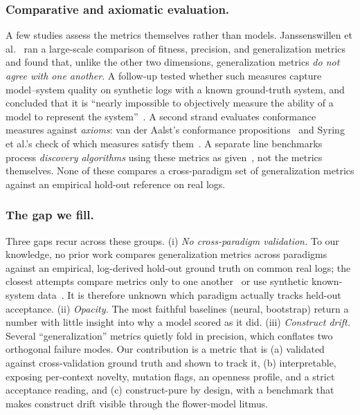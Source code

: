 \documentclass[runningheads]{llncs}
\begin{document}
\subsubsection{Comparative and axiomatic evaluation.}
A few studies assess the metrics themselves rather than models. Janssenswillen et al.~\cite{janssenswillen2017comparative} ran a large-scale comparison of fitness, precision, and generalization metrics and found that, unlike the other two dimensions, generalization metrics \emph{do not agree with one another}. A follow-up tested whether such measures capture model--system quality on synthetic logs with a known ground-truth system, and concluded that it is ``nearly impossible to objectively measure the ability of a model to represent the system''~\cite{janssenswillen2019confirmatory}. A second strand evaluates conformance measures against \emph{axioms}: van der Aalst's conformance propositions~\cite{vanderaalst2018propositions} and Syring et al.'s check of which measures satisfy them~\cite{syring2019conformance}. A separate line benchmarks process \emph{discovery algorithms} using these metrics as given~\cite{augusto2019benchmark}, not the metrics themselves. None of these compares a cross-paradigm set of generalization metrics against an empirical hold-out reference on real logs.

\subsubsection{The gap we fill.}
Three gaps recur across these groups. (i) \emph{No cross-paradigm validation.} To our knowledge, no prior work compares generalization metrics across paradigms against an empirical, log-derived hold-out ground truth on common real logs; the closest attempts compare metrics only to one another~\cite{janssenswillen2017comparative} or use synthetic known-system data~\cite{janssenswillen2019confirmatory}. It is therefore unknown which paradigm actually tracks held-out acceptance. (ii) \emph{Opacity.} The most faithful baselines (neural, bootstrap) return a number with little insight into why a model scored as it did. (iii) \emph{Construct drift.} Several ``generalization'' metrics quietly fold in precision, which conflates two orthogonal failure modes. Our contribution is a metric that is (a) validated against cross-validation ground truth and shown to track it, (b) interpretable, exposing per-context novelty, mutation flags, an openness profile, and a strict acceptance reading, and (c) construct-pure by design, with a benchmark that makes construct drift visible through the flower-model litmus.
\end{document}
